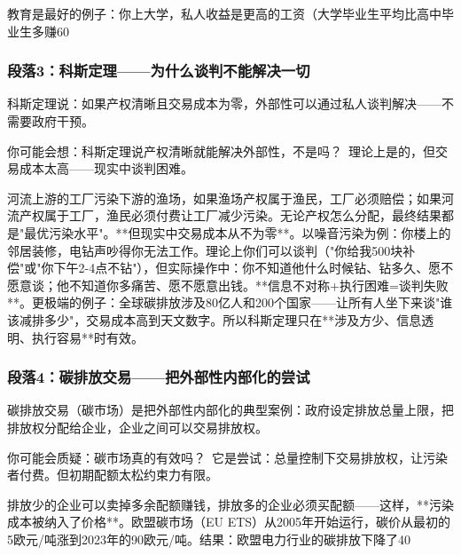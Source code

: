 \documentclass[openany, a4paper, 12pt]{book}
\newenvironment{motivation}{
	\vspace{0.5em}
	\begin{tcolorbox}[
		colback=gray!10,           %
		colframe=gray!60,          %
		title=\textit{本章动机 (Motivation)},
		fonttitle=\bfseries,
		arc=0mm,                   %
		leftrule=3mm               %
		]
		\small \itshape %
	}{
	\end{tcolorbox}
	\vspace{1em}
}
\begin{document}
\begin{motivation}
教育是最好的例子：你上大学，私人收益是更高的工资（大学毕业生平均比高中毕业生多赚60%

	\subsubsection*{段落3：科斯定理——为什么谈判不能解决一切}
	科斯定理说：如果产权清晰且交易成本为零，外部性可以通过私人谈判解决——不需要政府干预。
	\begin{tcolorbox}[colback=yellow!5, title=\textit{读者行为预测}]
		你可能会想：科斯定理说产权清晰就能解决外部性，不是吗？\ 理论上是的，但交易成本太高——现实中谈判困难。
	\end{tcolorbox}

河流上游的工厂污染下游的渔场，如果渔场产权属于渔民，工厂必须赔偿；如果河流产权属于工厂，渔民必须付费让工厂减少污染。无论产权怎么分配，最终结果都是"最优污染水平"。**但现实中交易成本从不为零**。以噪音污染为例：你楼上的邻居装修，电钻声吵得你无法工作。理论上你们可以谈判（"你给我500块补偿"或"你下午2-4点不钻"），但实际操作中：你不知道他什么时候钻、钻多久、愿不愿意谈；他不知道你多痛苦、愿不愿意出钱。**信息不对称+执行困难=谈判失败**。更极端的例子：全球碳排放涉及80亿人和200个国家——让所有人坐下来谈"谁该减排多少"，交易成本高到天文数字。所以科斯定理只在**涉及方少、信息透明、执行容易**时有效。

	\subsubsection*{段落4：碳排放交易——把外部性内部化的尝试}
	碳排放交易（碳市场）是把外部性内部化的典型案例：政府设定排放总量上限，把排放权分配给企业，企业之间可以交易排放权。
	\begin{tcolorbox}[colback=yellow!5, title=\textit{读者行为预测}]
		你可能会质疑：碳市场真的有效吗？\ 它是尝试：总量控制下交易排放权，让污染者付费。但初期配额太松约束力有限。
	\end{tcolorbox}

排放少的企业可以卖掉多余配额赚钱，排放多的企业必须买配额——这样，**污染成本被纳入了价格**。欧盟碳市场（EU ETS）从2005年开始运行，碳价从最初的5欧元/吨涨到2023年的90欧元/吨。结果：欧盟电力行业的碳排放下降了40%


\end{motivation}
\end{document}
